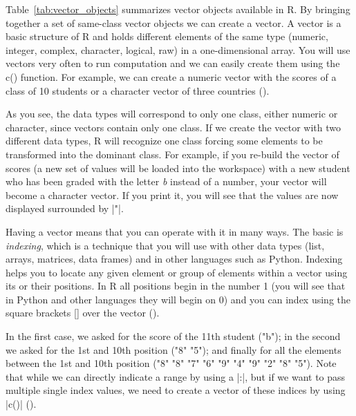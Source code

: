 Table~\ref{tab:vector_objects} summarizes vector objects available in
R. By bringing together a set of same-class vector objects we can
create a vector. A vector is a basic structure of R and holds
different elements of the same type (numeric, integer, complex,
character, logical, raw) in a one-dimensional array. You will use
vectors very often to run computation and we can easily create them
using the c() function. For example, we can create a numeric vector
with the scores of a class of 10 students or a character vector of
three countries ().


As you see, the data types will correspond to only one class, either
numeric or character, since vectors contain only one class. If we
create the vector with two different data types, R will recognize one
class forcing some elements to be transformed into the dominant
class. For example, if you re-build the vector of scores (a new set of
values will be loaded into the workspace) with a new student who has
been graded with the letter \emph{b} instead of a number, your vector
will become a character vector. If you print it, you will see that the
values are now displayed surrounded by |"|.


Having a vector means that you can operate with it in many ways. The
basic is \emph{indexing}, which is a technique that you will use with
other data types (list, arrays, matrices, data frames) and in other
languages such as Python.  Indexing helps you to locate any given
element or group of elements within a vector using its or their
positions. In R all positions begin in the number 1 (you will see that
in Python and other languages they will begin on 0) and you can index
using the square brackets [] over the vector ().


In the first case, we asked for the score of the 11th student ("b");
in the second we asked for the 1st and 10th position ("8" "5"); and
finally for all the elements between the 1st and 10th position ("8"
"8" "7" "6" "9" "4" "9" "2" "8" "5"). Note that while we can directly
indicate a range by using a |:|, but if we want to pass multiple
single index values, we need to create a vector of these indices by
using |c()| ().

